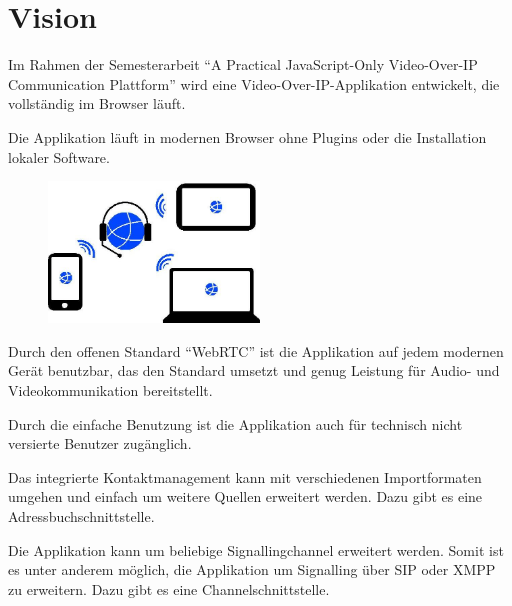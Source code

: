\chapter{Vision}
	Im Rahmen der Semesterarbeit ``A Practical JavaScript-Only Video-Over-IP Communication Plattform'' wird eine
	Video-Over-IP-Applikation entwickelt, die vollständig im Browser läuft.
	
	Die Applikation läuft in modernen Browser ohne Plugins oder die Installation lokaler Software.
			
	\begin{figure}[H]
		\centering
		\includegraphics[width=0.5\textwidth]{img/plattformUnabhaengigkeit.jpg}
		\label{plattformUnabhaengigkeit}
	\end{figure}
	
	Durch den offenen Standard ``WebRTC'' ist die Applikation auf jedem modernen Gerät benutzbar, das den Standard umsetzt und genug Leistung für Audio- und Videokommunikation bereitstellt.
	
	Durch die einfache Benutzung ist die Applikation auch für technisch nicht
	versierte Benutzer zugänglich.
	
	Das integrierte Kontaktmanagement kann mit verschiedenen Importformaten umgehen und einfach um weitere Quellen erweitert werden. Dazu gibt es eine Adressbuchschnittstelle.
	
	Die Applikation kann um beliebige Signallingchannel erweitert werden. Somit ist
	es unter anderem möglich, die Applikation um Signalling über SIP oder XMPP zu
	erweitern. Dazu gibt es eine Channelschnittstelle.
	
	
